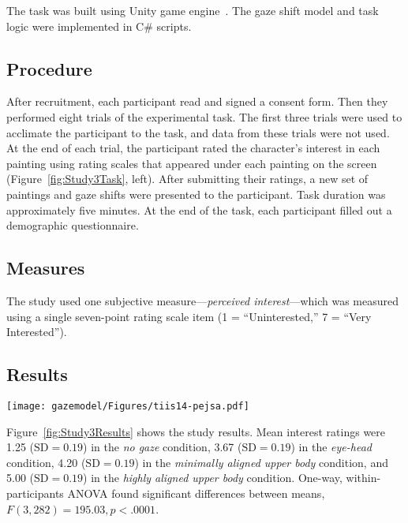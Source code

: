 The task was built using Unity game engine~\cite{unity3d}. The gaze shift model and task logic were implemented in C# scripts.

\subsection{Procedure}

After recruitment, each participant read and signed a consent form. Then they performed eight trials of the experimental task. The first three trials were used to acclimate the participant to the task, and data from these trials were not used. At the end of each trial, the participant rated the character's interest in each painting using rating scales that appeared under each painting on the screen (Figure~\ref{fig:Study3Task}, left). After submitting their ratings, a new set of paintings and gaze shifts were presented to the participant. Task duration was approximately five minutes. At the end of the task, each participant filled out a demographic questionnaire.

\subsection{Measures}

The study used one subjective measure---\emph{perceived interest}---which was measured using a single seven-point rating scale item (1 = ``Uninterested,'' 7 = ``Very Interested'').

\subsection{Results}

\begin{figure*}[b]
\centering
\texttt{[image: gazemodel/Figures/tiis14-pejsa.pdf]}
\caption{Results for perceived interest ratings for each type of gaze shift. Results for gaze shifts with upper body movement are shown in red.}
\label{fig:Study3Results}
\end{figure*}

Figure~\ref{fig:Study3Results} shows the study results. Mean interest ratings were 1.25 ($\mathrm{SD} = 0.19$) in the \emph{no gaze} condition, 3.67 ($\mathrm{SD} = 0.19$) in the \emph{eye-head} condition, 4.20 ($\mathrm{SD} = 0.19$) in the \emph{minimally aligned upper body} condition, and 5.00 ($\mathrm{SD} = 0.19$) in the \emph{highly aligned upper body} condition. One-way, within-participants ANOVA found significant differences between means, $F(3, 282) = 195.03, p < .0001$.

